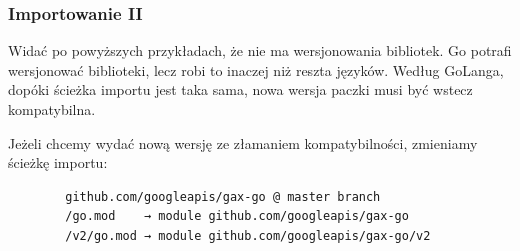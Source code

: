 \documentclass[10pt]{beamer}
\begin{document}
\begin{frame}[fragile]
    \frametitle{Importowanie II}
    Widać po powyższych przykładach, że nie ma wersjonowania bibliotek. Go potrafi wersjonować biblioteki,
    lecz robi to inaczej niż reszta języków. Według GoLanga, dopóki ścieżka importu
    jest taka sama, nowa wersja paczki musi być wstecz kompatybilna.

    Jeżeli chcemy wydać nową wersję ze złamaniem kompatybilności, zmieniamy ścieżkę 
    importu:

    \begin{verbatim}
        github.com/googleapis/gax-go @ master branch
        /go.mod    → module github.com/googleapis/gax-go
        /v2/go.mod → module github.com/googleapis/gax-go/v2
    \end{verbatim}

\end{frame}
\end{document}
